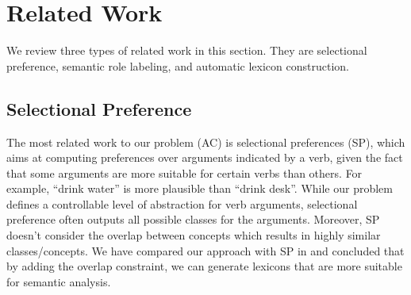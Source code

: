 \section{Related Work}
\label{sec:related}
We review three types of related work in this section.
They are selectional preference, semantic role labeling,
and automatic lexicon construction.

\subsection{Selectional Preference}
The most related work to our problem (AC) is
selectional preferences (SP), which
aims at computing preferences over arguments indicated by a verb,
given the fact that some arguments are more
suitable for certain verbs than others. For example,
``drink water'' is more plausible than ``drink desk''.
While our problem defines a controllable level of abstraction
for verb arguments, selectional preference
often outputs all possible classes for the arguments.
Moreover, SP doesn't consider the overlap between concepts
which results in highly similar classes/concepts.
We have compared our approach with SP
in  and concluded that by adding the overlap constraint,
we can generate lexicons that are more suitable for semantic analysis.


